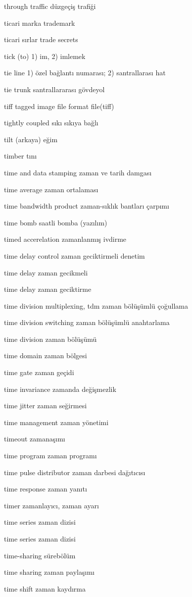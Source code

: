 \documentclass[12pt,fleqn]{article}\usepackage{../../common}
\begin{document}
through traffic düzgeçiş trafiği

ticari marka trademark

ticari sırlar trade secrets

tick (to) 1) im, 2) imlemek

tie line 1) özel bağlantı numarası; 2) santrallarası hat

tie trunk santrallararası gövdeyol

tiff tagged image file format file(tiff)

tightly coupled sıkı sıkıya bağlı

tilt (arkaya) eğim

timber tını

time and data stamping zaman ve tarih damgası

time average zaman ortalaması

time bandwidth product zaman-sıklık bantları çarpımı

time bomb saatli bomba (yazılım)

timed accerelation zamanlanmış ivdirme

time delay control zaman geciktirmeli denetim

time delay zaman gecikmeli

time delay zaman geciktirme

time division multiplexing, tdm zaman bölüşümlü çoğullama

time division switching zaman bölüşümlü anahtarlama

time division zaman bölüşümü

time domain zaman bölgesi

time gate zaman geçidi

time invariance zamanda değişmezlik

time jitter zaman seğirmesi

time management zaman yönetimi

timeout zamanaşımı

time program zaman programı

time pulse distributor zaman darbesi dağıtıcısı

time response zaman yanıtı

timer zamanlayıcı, zaman ayarı

time series zaman dizisi

time series zaman dizisi

time-sharing sürebölüm

time sharing zaman paylaşımı

time shift zaman kaydırma
\end{document}
